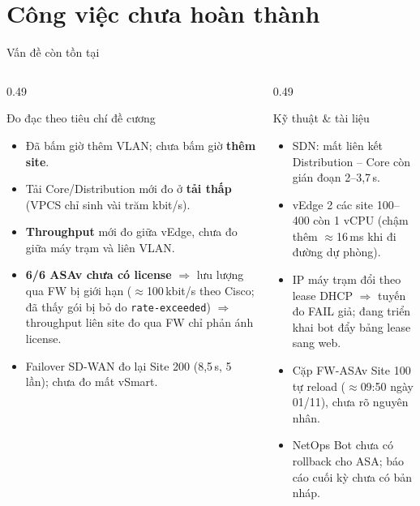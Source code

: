\documentclass[aspectratio=169, 10pt, xcolor={table}]{beamer}
\begin{document}
\section{Công việc chưa hoàn thành}

\begin{frame}{Vấn đề còn tồn tại}
    \begin{columns}[T]
        \begin{column}{0.49\textwidth}
            \begin{card}[accent]{Đo đạc theo tiêu chí đề cương}
                \footnotesize
                \begin{itemize}\setlength{\itemsep}{1pt}
                    \item Đã bấm giờ thêm VLAN; chưa bấm giờ \textbf{thêm site}.
                    \item Tải Core/Distribution mới đo ở \textbf{tải thấp} (VPCS chỉ sinh vài trăm kbit/s).
                    \item \textbf{Throughput} mới đo giữa vEdge, chưa đo giữa máy trạm và liên VLAN.
                    \item \textbf{6/6 ASAv chưa có license} $\Rightarrow$ lưu lượng qua FW bị giới hạn ($\approx$100\,kbit/s theo Cisco; đã thấy gói bị bỏ do \texttt{rate-exceeded}) $\Rightarrow$ throughput liên site đo qua FW chỉ phản ánh license.
                    \item Failover SD-WAN đo lại Site 200 (8,5\,s, 5 lần); chưa đo mất vSmart.
                \end{itemize}
            \end{card}
        \end{column}
        \begin{column}{0.49\textwidth}
            \begin{card}[badRed]{Kỹ thuật \& tài liệu}
                \footnotesize
                \begin{itemize}\setlength{\itemsep}{1pt}
                    \item SDN: mất liên kết Distribution -- Core còn gián đoạn 2--3,7\,s.
                    \item vEdge 2 các site 100--400 còn 1 vCPU (chậm thêm $\approx$16\,ms khi đi đường dự phòng).
                    \item IP máy trạm đổi theo lease DHCP $\Rightarrow$ tuyến đo FAIL giả; đang triển khai bot đẩy bảng lease sang web.
                    \item Cặp FW-ASAv Site 100 tự reload ($\approx$09:50 ngày 01/11), chưa rõ nguyên nhân.
                    \item NetOps Bot chưa có rollback cho ASA; báo cáo cuối kỳ chưa có bản nháp.
                \end{itemize}
            \end{card}
        \end{column}
    \end{columns}
\end{frame}
\end{document}

